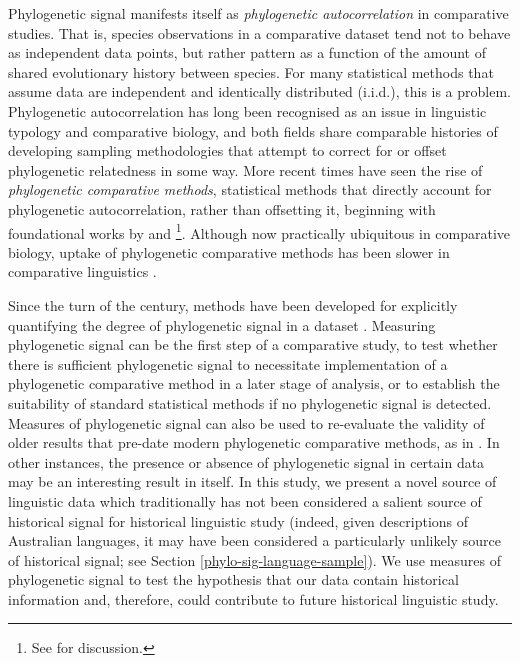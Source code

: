 Phylogenetic signal manifests itself as \emph{phylogenetic autocorrelation} in comparative studies. That is, species observations in a comparative dataset tend not to behave as independent data points, but rather pattern as a function of the amount of shared evolutionary history between species. For many statistical methods that assume data are independent and identically distributed (i.i.d.), this is a problem. Phylogenetic autocorrelation has long been recognised as an issue in linguistic typology and comparative biology, and both fields share comparable histories of developing sampling methodologies that attempt to correct for or offset phylogenetic relatedness in some way. More recent times have seen the rise of \emph{phylogenetic comparative methods}, statistical methods that directly account for phylogenetic autocorrelation, rather than offsetting it, beginning with foundational works by \textcite{felsenstein_phylogenies_1985} and \textcite{grafen_phylogenetic_1989}\footnote{See \textcite{nunn_comparative_2011} for discussion.}. Although now practically ubiquitous in comparative biology, uptake of phylogenetic comparative methods has been slower in comparative linguistics \autocites[notwithstanding studies such as][]{dunn_evolved_2011}{maurits_tracing_2014}{verkerk_diachronic_2014}{birchall_comparison_2015}{zhou_quantifying_2015}{calude_typology_2016}{dunn_dative_2017}{verkerk_phylogenetic_2017}{widmer_np_2017}{blasi_human_2019}.

Since the turn of the century, methods have been developed for explicitly quantifying the degree of phylogenetic signal in a dataset \autocite[p.~591]{revell_phylogenetic_2008}. Measuring phylogenetic signal can be the first step of a comparative study, to test whether there is sufficient phylogenetic signal to necessitate implementation of a phylogenetic comparative method in a later stage of analysis, or to establish the suitability of standard statistical methods if no phylogenetic signal is detected. Measures of phylogenetic signal can also be used to re-evaluate the validity of older results that pre-date modern phylogenetic comparative methods, as in \textcite{freckleton_phylogenetic_2002}. In other instances, the presence or absence of phylogenetic signal in certain data may be an interesting result in itself. In this study, we present a novel source of linguistic data which traditionally has not been considered a salient source of historical signal for historical linguistic study (indeed, given descriptions of Australian languages, it may have been considered a particularly unlikely source of historical signal; see Section \ref{phylo-sig-language-sample}). We use measures of phylogenetic signal to test the hypothesis that our data contain historical information and, therefore, could contribute to future historical linguistic study.

